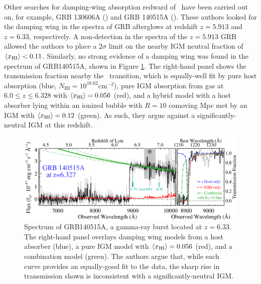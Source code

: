 Other searches for damping-wing absorption redward of \lya\ have been carried out on, for example, GRB 130606A (\citealt{Chornock:2013una}) and GRB 140515A (\citealt{Chornock:2014fva}). These authors looked for the damping wing in the spectra of GRB afterglows at redshift $z = 5.913$ and $z = 6.33$, respectively. A non-detection in the spectra of the $z = 5.913$ GRB allowed the authors to place a $2\sigma$ limit on the nearby IGM neutral fraction of $\langle x_{\text{HI}}\rangle < 0.11$. Similarly, no strong evidence of a damping wing was found in the spectrum of GRB140515A, shown in Figure \ref{fig:GRB140515A}. The right-hand panel shows the transmission fraction nearby the \lya\ transition, which is equally-well fit by pure host absorption (blue, $N_{\text{HI}} = 10^{18.62}\text{cm}^{-2}$), pure IGM absorption from gas at $6.0 \leq z \leq 6.328$ with $\langle x_{\text{HI}}\rangle = 0.056$ (red), and a hybrid model with a host absorber lying within an ionized bubble with $R = 10$ comoving Mpc met by an IGM with $\langle x_{\text{HI}}\rangle = 0.12$ (green). As such, they argue against a significantly-neutral IGM at this redshift.  

\begin{figure}[h]
  \centering
  \includegraphics[width=14cm]{GRB140515A.eps}
  \caption{Spectrum of GRB140515A, a gamma-ray burst located at $z = 6.33$. The right-hand panel overlays damping wing models from a host absorber (blue), a pure IGM model with $\langle x_{\text{HI}}\rangle = 0.056$ (red), and a combination model (green). The authors argue that, while each curve provides an equally-good fit to the data, the sharp rise in transmission shown is inconsistent with a significantly-neutral IGM. }
  \label{fig:GRB140515A}
\end{figure}


